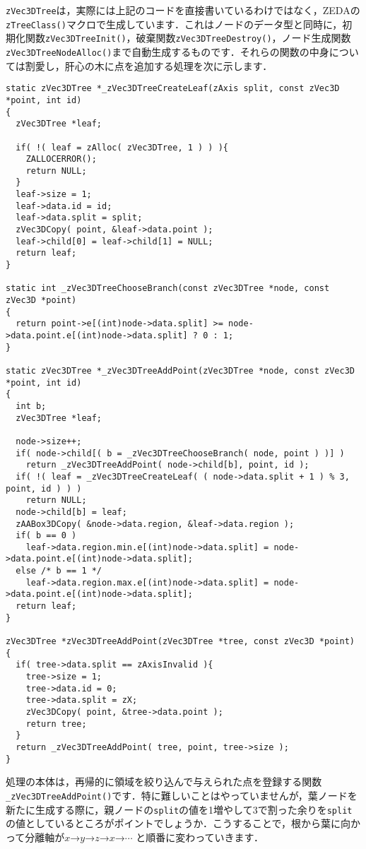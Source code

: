 ﻿\documentclass[a4paper]{jsarticle}
\begin{document}
\verb|zVec3DTree|は，実際には上記のコードを直接書いているわけではなく，ZEDAの\verb|zTreeClass()|マクロで生成しています．これはノードのデータ型と同時に，初期化関数\verb|zVec3DTreeInit()|，破棄関数\verb|zVec3DTreeDestroy()|，ノード生成関数\verb|zVec3DTreeNodeAlloc()|まで自動生成するものです．それらの関数の中身については割愛し，肝心の木に点を追加する処理を次に示します．
\begin{screen}
\begin{verbatim}
static zVec3DTree *_zVec3DTreeCreateLeaf(zAxis split, const zVec3D *point, int id)
{
  zVec3DTree *leaf;

  if( !( leaf = zAlloc( zVec3DTree, 1 ) ) ){
    ZALLOCERROR();
    return NULL;
  }
  leaf->size = 1;
  leaf->data.id = id;
  leaf->data.split = split;
  zVec3DCopy( point, &leaf->data.point );
  leaf->child[0] = leaf->child[1] = NULL;
  return leaf;
}

static int _zVec3DTreeChooseBranch(const zVec3DTree *node, const zVec3D *point)
{
  return point->e[(int)node->data.split] >= node->data.point.e[(int)node->data.split] ? 0 : 1;
}

static zVec3DTree *_zVec3DTreeAddPoint(zVec3DTree *node, const zVec3D *point, int id)
{
  int b;
  zVec3DTree *leaf;

  node->size++;
  if( node->child[( b = _zVec3DTreeChooseBranch( node, point ) )] )
    return _zVec3DTreeAddPoint( node->child[b], point, id );
  if( !( leaf = _zVec3DTreeCreateLeaf( ( node->data.split + 1 ) % 3, point, id ) ) )
    return NULL;
  node->child[b] = leaf;
  zAABox3DCopy( &node->data.region, &leaf->data.region );
  if( b == 0 )
    leaf->data.region.min.e[(int)node->data.split] = node->data.point.e[(int)node->data.split];
  else /* b == 1 */
    leaf->data.region.max.e[(int)node->data.split] = node->data.point.e[(int)node->data.split];
  return leaf;
}

zVec3DTree *zVec3DTreeAddPoint(zVec3DTree *tree, const zVec3D *point)
{
  if( tree->data.split == zAxisInvalid ){
    tree->size = 1;
    tree->data.id = 0;
    tree->data.split = zX;
    zVec3DCopy( point, &tree->data.point );
    return tree;
  }
  return _zVec3DTreeAddPoint( tree, point, tree->size );
}
\end{verbatim}
\end{screen}
処理の本体は，再帰的に領域を絞り込んで与えられた点を登録する関数\verb|_zVec3DTreeAddPoint()|です．特に難しいことはやっていませんが，葉ノードを新たに生成する際に，親ノードの\verb|split|の値を1増やして3で割った余りを\verb|split|の値としているところがポイントでしょうか．こうすることで，根から葉に向かって分離軸が$x$→$y$→$z$→$x$→$\cdots$ と順番に変わっていきます．
\end{document}
